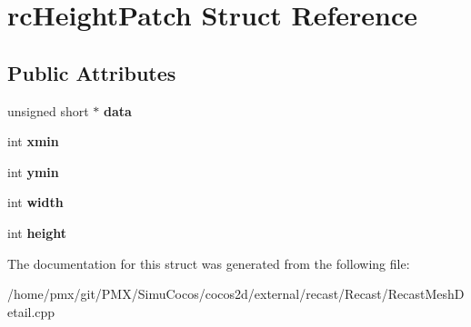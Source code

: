 \hypertarget{structrcHeightPatch}{}\section{rc\+Height\+Patch Struct Reference}
\label{structrcHeightPatch}
\subsection*{Public Attributes}
\begin{DoxyCompactItemize}
\item 
\mbox{\label{structrcHeightPatch_a6de49c5f53136e6f4a915ba41a0cc00c}} 
unsigned short $\ast$ {\bfseries data}
\item 
\mbox{\label{structrcHeightPatch_ac8af7bf8fa73d87c84ba155fd48be28a}} 
int {\bfseries xmin}
\item 
\mbox{\label{structrcHeightPatch_addd346c10b03e29029ffe5c520e8f66f}} 
int {\bfseries ymin}
\item 
\mbox{\label{structrcHeightPatch_ab26096449132f591083d5355b88953f8}} 
int {\bfseries width}
\item 
\mbox{\label{structrcHeightPatch_a6e2f9591899f48231b2d13e87bc5ba6a}} 
int {\bfseries height}
\end{DoxyCompactItemize}


The documentation for this struct was generated from the following file\+:\begin{DoxyCompactItemize}
\item 
/home/pmx/git/\+P\+M\+X/\+Simu\+Cocos/cocos2d/external/recast/\+Recast/Recast\+Mesh\+Detail.\+cpp\end{DoxyCompactItemize}

